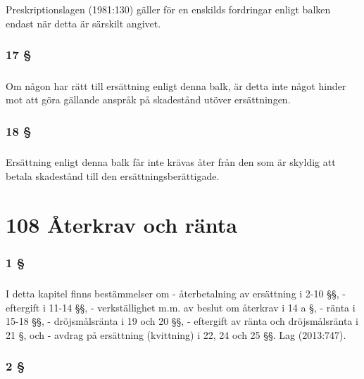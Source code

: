 \documentclass[a4paper,notitlepage,openany,10pt]{book}
\begin{document}
\paragraph*{}
Preskriptionslagen (1981:130) gäller för en enskilds fordringar enligt balken endast när detta är särskilt angivet.
\subsection*{17 §}
\paragraph*{}
Om någon har rätt till ersättning enligt denna balk, är detta inte något hinder mot att göra gällande anspråk på skadestånd utöver ersättningen.
\subsection*{18 §}
\paragraph*{}
Ersättning enligt denna balk får inte krävas åter från den som är skyldig att betala skadestånd till den ersättningsberättigade.
\chapter*{108 Återkrav och ränta}
\subsection*{1 §}
\paragraph*{}
I detta kapitel finns bestämmelser om
\newline - återbetalning av ersättning i 2-10 §§,
\newline - eftergift i 11-14 §§,
\newline - verkställighet m.m. av beslut om återkrav i 14 a §,
\newline - ränta i 15-18 §§,
\newline - dröjsmålsränta i 19 och 20 §§,
\newline - eftergift av ränta och dröjsmålsränta i 21 §, och
\newline - avdrag på ersättning (kvittning) i 22, 24 och 25 §§.
Lag (2013:747).
\subsection*{2 §}
\end{document}
